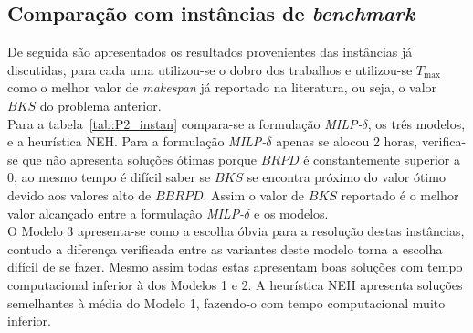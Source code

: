 \subsection{Comparação com instâncias de \textit{benchmark}}

De seguida são apresentados os resultados provenientes das instâncias já discutidas, para cada uma utilizou-se o dobro dos trabalhos e utilizou-se $T_{\max}$ como o melhor valor de \textit{makespan} já reportado na literatura, ou seja, o valor $BKS$ do problema anterior.\\

Para a tabela~\ref{tab:P2_instan} compara-se a formulação \textit{MILP-$\delta$}, os três modelos, e a heurística NEH. Para a formulação \textit{MILP-$\delta$} apenas se alocou 2 horas, verifica-se que não apresenta soluções ótimas porque $BRPD$ é constantemente superior a 0, ao mesmo tempo é difícil saber se $BKS$ se encontra próximo do valor ótimo devido aos valores alto de $BBRPD$. Assim o valor de $BKS$ reportado é o melhor valor alcançado entre a formulação \textit{MILP-$\delta$} e os modelos.\\

O Modelo 3 apresenta-se como a escolha óbvia para a resolução destas instâncias, contudo a diferença verificada entre as variantes deste modelo torna a escolha difícil de se fazer. Mesmo assim todas estas apresentam boas soluções com tempo computacional inferior à dos Modelos 1 e 2. A heurística NEH apresenta soluções semelhantes à média do Modelo 1, fazendo-o com tempo computacional muito inferior.\\

